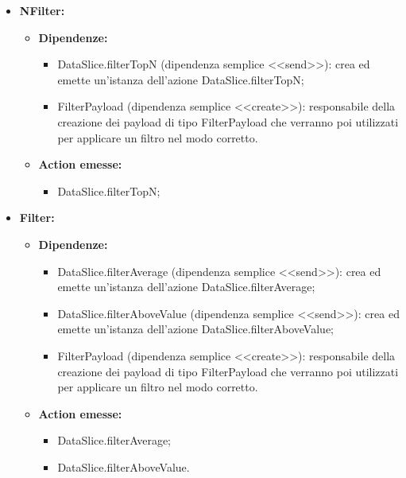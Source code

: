 \begin{itemize}
    \item \textbf{NFilter:}
          \begin{itemize}
              \item \textbf{Dipendenze:}
                    \begin{itemize}
                        \item DataSlice.filterTopN (dipendenza semplice <<send>>): crea ed emette un'istanza
                              dell'azione DataSlice.filterTopN;
                        \item FilterPayload (dipendenza semplice <<create>>): responsabile della creazione
                              dei payload di tipo FilterPayload che verranno poi utilizzati per applicare un
                              filtro nel modo corretto.
                    \end{itemize}
              \item \textbf{Action emesse:}
                    \begin{itemize}
                        \item DataSlice.filterTopN;
                    \end{itemize}
          \end{itemize}

    \item \textbf{Filter:}
          \begin{itemize}
              \item \textbf{Dipendenze:}
                    \begin{itemize}
                        \item DataSlice.filterAverage (dipendenza semplice <<send>>): crea ed emette
                              un'istanza dell'azione DataSlice.filterAverage;
                        \item DataSlice.filterAboveValue (dipendenza semplice <<send>>): crea ed emette
                              un'istanza dell'azione DataSlice.filterAboveValue;
                        \item FilterPayload (dipendenza semplice <<create>>): responsabile della creazione
                              dei payload di tipo FilterPayload che verranno poi utilizzati per applicare un
                              filtro nel modo corretto.
                    \end{itemize}
              \item \textbf{Action emesse:}
                    \begin{itemize}
                        \item DataSlice.filterAverage;
                        \item DataSlice.filterAboveValue.
                    \end{itemize}
          \end{itemize}


\end{itemize}
